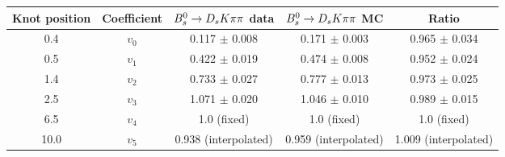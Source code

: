 \begin{tabular}{c c c c c}
\hline
\hline
Knot position & Coefficient & ${{B}^0_{s}}\rightarrow{\ensuremath{{D}_{s}}}{\ensuremath{K}}{\ensuremath{\pi}}{\ensuremath{\pi}}$ data & ${{B}^0_{s}}\rightarrow{\ensuremath{{D}_{s}}}{\ensuremath{K}}{\ensuremath{\pi}}{\ensuremath{\pi}}$ MC & Ratio \\
\hline
0.4 & $v_{0}$ & 0.117 $\pm$ 0.008 & 0.171 $\pm$ 0.003 & 0.965 $\pm$ 0.034\\
0.5 & $v_{1}$ & 0.422 $\pm$ 0.019 & 0.474 $\pm$ 0.008 & 0.952 $\pm$ 0.024\\
1.4 & $v_{2}$ & 0.733 $\pm$ 0.027 & 0.777 $\pm$ 0.013 & 0.973 $\pm$ 0.025\\
2.5 & $v_{3}$ & 1.071 $\pm$ 0.020 & 1.046 $\pm$ 0.010 & 0.989 $\pm$ 0.015\\
6.5 & $v_{4}$ &  1.0 (fixed) & 1.0 (fixed) & 1.0 (fixed)\\
10.0 & $v_{5}$ & 0.938 (interpolated) & 0.959 (interpolated) & 1.009 (interpolated) \\
\hline
\hline
\end{tabular}
